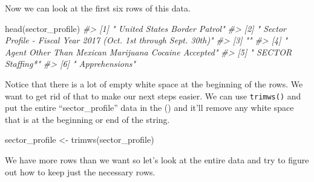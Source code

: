 \documentclass[
]{krantz}
\makeatletter
\newenvironment{Shaded}{\begin{snugshade}}{\end{snugshade}}
\newcommand{\CommentTok}[1]{\textcolor[rgb]{0.37,0.37,0.37}{\textit{#1}}}
\newcommand{\FunctionTok}[1]{\textcolor[rgb]{0,0,0}{#1}}
\newcommand{\NormalTok}[1]{#1}
\newcommand{\OtherTok}[1]{\textcolor[rgb]{0.37,0.37,0.37}{#1}}
\newenvironment{kframe}{%
\medskip{}
\setlength{\fboxsep}{.8em}
 \def\at@end@of@kframe{}%
 \ifinner\ifhmode%
  \def\at@end@of@kframe{\end{minipage}}%
  \begin{minipage}{\columnwidth}%
 \fi\fi%
 \def\FrameCommand##1{\hskip\@totalleftmargin \hskip-\fboxsep
 \colorbox{shadecolor}{##1}\hskip-\fboxsep
     \hskip-\linewidth \hskip-\@totalleftmargin \hskip\columnwidth}%
 \MakeFramed {\advance\hsize-\width
   \@totalleftmargin\z@ \linewidth\hsize
   \@setminipage}}%
 {\par\unskip\endMakeFramed%
 \at@end@of@kframe}
\renewenvironment{Shaded}{\begin{kframe}}{\end{kframe}}
\makeatother
\begin{document}
Now we can look at the first six rows of this data.

\begin{Shaded}
\begin{Highlighting}[]
\FunctionTok{head}\NormalTok{(sector\_profile)}
\CommentTok{\#\textgreater{} [1] "                                                           United States Border Patrol"                                                                      }
\CommentTok{\#\textgreater{} [2] "                                                            Sector Profile {-} Fiscal Year 2017 (Oct. 1st through Sept. 30th)"                                 }
\CommentTok{\#\textgreater{} [3] ""                                                                                                                                                            }
\CommentTok{\#\textgreater{} [4] "                                                Agent                              Other Than Mexican            Marijuana          Cocaine         Accepted"}
\CommentTok{\#\textgreater{} [5] "              SECTOR                           Staffing*"                                                                                                    }
\CommentTok{\#\textgreater{} [6] "                                                             Apprehensions"}
\end{Highlighting}
\end{Shaded}

Notice that there is a lot of empty white space at the beginning of the rows. We want to get rid of that to make our next steps easier. We can use \texttt{trimws()} and put the entire ``sector\_profile'' data in the () and it'll remove any white space that is at the beginning or end of the string.

\begin{Shaded}
\begin{Highlighting}[]
\NormalTok{sector\_profile }\OtherTok{\textless{}{-}} \FunctionTok{trimws}\NormalTok{(sector\_profile)}
\end{Highlighting}
\end{Shaded}

We have more rows than we want so let's look at the entire data and try to figure out how to keep just the necessary rows.
\end{document}
